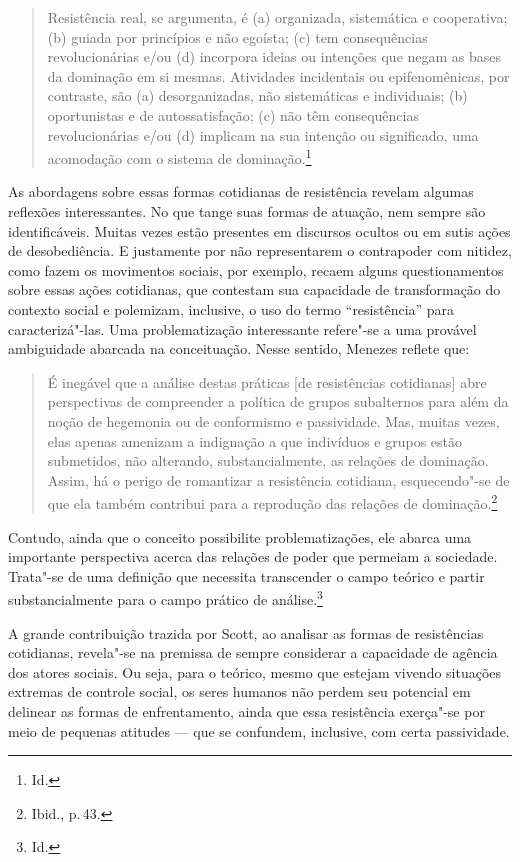 \begin{quote}
Resistência real, se argumenta, é (a) organizada, sistemática e
cooperativa; (b) guiada por princípios e não egoísta; (c) tem
consequências revolucionárias e/ou (d) incorpora ideias ou intenções
que negam as bases da dominação em si mesmas. Atividades incidentais ou
epifenomênicas, por contraste, são (a) desorganizadas, não sistemáticas
e individuais; (b) oportunistas e de autossatisfação; (c) não têm
consequências revolucionárias e/ou (d) implicam na sua intenção ou
significado, uma acomodação com o sistema de dominação.\footnote{Id.}
\end{quote}

As abordagens sobre essas formas cotidianas de resistência revelam
algumas reflexões interessantes. No que tange suas formas de atuação,
nem sempre são identificáveis. Muitas vezes estão presentes em discursos
ocultos ou em sutis ações de desobediência. E justamente por não
representarem o contrapoder com nitidez, como fazem os movimentos
sociais, por exemplo, recaem alguns questionamentos sobre essas ações
cotidianas, que contestam sua capacidade de transformação do contexto
social e polemizam, inclusive, o uso do termo ``resistência'' para
caracterizá"-las. Uma problematização interessante refere"-se a uma
provável ambiguidade abarcada na conceituação. Nesse sentido, Menezes
reflete que:

\begin{quote}
É inegável que a análise destas práticas {[}de resistências
cotidianas{]} abre perspectivas de compreender a política de grupos
subalternos para além da noção de hegemonia ou de conformismo e
passividade. Mas, muitas vezes, elas apenas amenizam a indignação a que
indivíduos e grupos estão submetidos, não alterando, substancialmente,
as relações de dominação. Assim, há o perigo de romantizar a resistência
cotidiana, esquecendo"-se de que ela também contribui para a reprodução
das relações de dominação.\footnote{Ibid., p.\,43.}
\end{quote}

Contudo, ainda que o conceito possibilite problematizações, ele abarca
uma importante perspectiva acerca das relações de poder que permeiam a
sociedade. Trata"-se de uma definição que necessita transcender o campo
teórico e partir substancialmente para o campo prático de análise.\footnote{Id.}

A grande contribuição trazida por Scott, ao analisar as formas de
resistências cotidianas, revela"-se na premissa de sempre considerar a
capacidade de agência dos atores sociais. Ou seja, para o teórico, mesmo
que estejam vivendo situações extremas de controle social, os seres
humanos não perdem seu potencial em delinear as formas de enfrentamento,
ainda que essa resistência exerça"-se por meio de pequenas atitudes ---
que se confundem, inclusive, com certa passividade.

